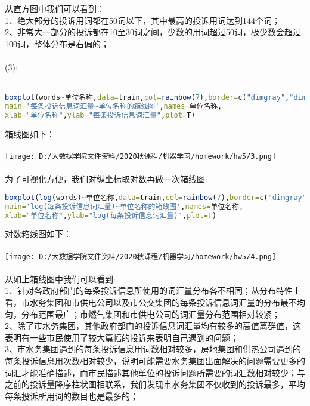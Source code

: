 \documentclass[]{article}
\begin{document}
从直方图中我们可以看到：\\
1、绝大部分的投诉用词都在50词以下，其中最高的投诉用词达到144个词；\\
2、非常大一部分的投诉都在10至30词之间，少数的用词超过50词，极少数会超过100词，整体分布是右偏的；\\\\
(3):\\\\
\begin{lstlisting}[language=R]
boxplot(words~单位名称,data=train,col=rainbow(7),border=c("dimgray","dimgrey"),
main='每条投诉信息词汇量~单位名称的箱线图',names=单位名称,
xlab="单位名称",ylab="每条投诉信息词汇量",plot=T)
\end{lstlisting}
箱线图如下：\\\\
\texttt{[image: D:/大数据学院文件资料/2020秋课程/机器学习/homework/hw5/3.png]}\\\\
为了可视化方便，我们对纵坐标取对数再做一次箱线图:
\begin{lstlisting}[language=R]
boxplot(log(words)~单位名称,data=train,col=rainbow(7),border=c("dimgray","dimgrey"),
main='log(每条投诉信息词汇量)~单位名称的箱线图',names=单位名称,
xlab="单位名称",ylab="log(每条投诉信息词汇量)",plot=T)
\end{lstlisting}
对数箱线图如下：\\\\
\texttt{[image: D:/大数据学院文件资料/2020秋课程/机器学习/homework/hw5/4.png]}\\\\
从如上箱线图中我们可以看到:\\
1、针对各政府部门的每条投诉信息所使用的词汇量分布各不相同；从分布特性上看，市水务集团和市供电公司以及市公交集团的每条投诉信息词汇量的分布最不均匀，分布范围最广；市燃气集团和市供电公司的词汇量分布范围相对较紧；\\
2、除了市水务集团，其他政府部门的投诉信息词汇量均有较多的高值离群值，这表明有一些市民使用了较大篇幅的投诉来表明自己遇到的问题；\\
3、市水务集团遇到的每条投诉信息用词数相对较多，房地集团和供热公司遇到的每条投诉信息用次数相对较少，说明可能需要水务集团出面解决的问题需要更多的词汇才能准确描述，而市民描述其他单位的投诉问题所需要的词汇数相对较少；与之前的投诉量降序柱状图相联系，我们发现市水务集团不仅收到的投诉最多，平均每条投诉所用词的数目也是最多的；\\\\
\end{document}

